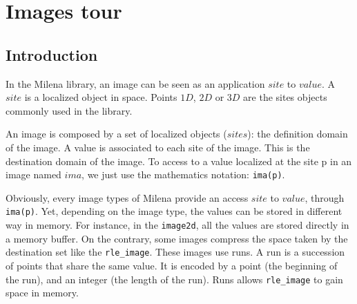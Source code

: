 






\section{Images tour}

\subsection{Introduction}


In the Milena library, an image can be seen as an application
$site$ to $value$.
A $site$ is a localized object in space.
Points $1D$, $2D$ or $3D$ are the sites objects commonly used in the
library.

An image is composed by a set of localized objects ($sites$): the definition domain of the image.
A value is associated to each site of the image. This is the destination domain
of the image.
To access to a value  localized at the site p in an image named $ima$, we
just use the mathematics notation: \verb+ima(p)+.

Obviously, every image types of Milena provide an access $site$ to $value$,
through \verb+ima(p)+. Yet, depending on the image type, the values can be
stored in different way in memory.
For instance, in the \verb+image2d+, all the values are stored directly in a
memory buffer.
On the contrary, some images compress the space taken by the destination set
like the \verb+rle_image+.
These images use runs.
A run is a succession of points that share the same value. It is encoded by
a point (the beginning of the run), and an integer (the length of the run).
Runs allows \verb+rle_image+ to gain space in memory.\\


